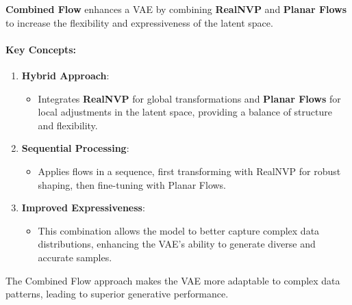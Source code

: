 \documentclass[11pt]{article}
\providecommand{\tightlist}{%
      \setlength{\itemsep}{0pt}\setlength{\parskip}{0pt}}
\begin{document}
\textbf{Combined Flow} enhances a VAE by combining \textbf{RealNVP} and
\textbf{Planar Flows} to increase the flexibility and expressiveness of
the latent space.

\paragraph{Key Concepts:}\label{key-concepts}

\begin{enumerate}
\def\labelenumi{\arabic{enumi}.}
\tightlist
\item
  \textbf{Hybrid Approach}:

  \begin{itemize}
  \tightlist
  \item
    Integrates \textbf{RealNVP} for global transformations and
    \textbf{Planar Flows} for local adjustments in the latent space,
    providing a balance of structure and flexibility.
  \end{itemize}
\item
  \textbf{Sequential Processing}:

  \begin{itemize}
  \tightlist
  \item
    Applies flows in a sequence, first transforming with RealNVP for
    robust shaping, then fine-tuning with Planar Flows.
  \end{itemize}
\item
  \textbf{Improved Expressiveness}:

  \begin{itemize}
  \tightlist
  \item
    This combination allows the model to better capture complex data
    distributions, enhancing the VAE's ability to generate diverse and
    accurate samples.
  \end{itemize}
\end{enumerate}

The Combined Flow approach makes the VAE more adaptable to complex data
patterns, leading to superior generative performance.
\end{document}
